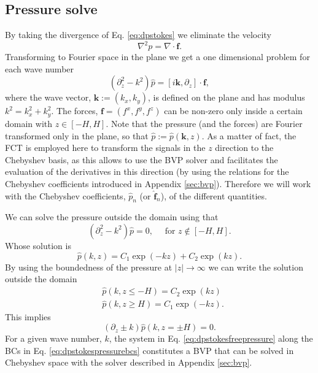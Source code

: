 \documentclass[ twoside,openright,titlepage,numbers=noenddot,%
headinclude,footinclude,cleardoublepage=empty,abstract=on,
BCOR=5mm,paper=b5,fontsize=11pt, dvipsnames
]{scrreprt}
\renewcommand{\vec}[1]{\bm{#1}}
\newcommand{\fou}[1]{\widehat{#1}}
\begin{document}
\subsection*{Pressure solve}
By taking the divergence of Eq. \eqref{eq:dpstokes} we eliminate the velocity
\begin{equation}
  \label{eq:dpstokespressure}
  \nabla^2 p = \nabla\cdot\vec{f}.
\end{equation}
Transforming to Fourier space in the plane we get a one dimensional problem for each wave number
\begin{equation}
  \label{eq:dpstokesfreepressure}
  (\partial^2_{z}-k^2)\fou{p} =
  \left[
    i\vec{k},
    \partial_z\right]
  \cdot\vec{f},
\end{equation}
where the wave vector, $\vec{k}:=(k_x, k_y)$, is defined on the plane and has modulus $k^2 = k_x^2 + k_y^2$. The forces, $\vec{f}=(f^x, f^y, f^z)$ can be non-zero only inside a certain domain with $z\in [-H,H]$. Note that the pressure (and the forces) are Fourier transformed only in the plane, so that $\fou{p} :=\fou{p}(\vec{k}, z)$. As a matter of fact, the \gls{FCT} is employed here to transform the signals in the $z$ direction to the Chebyshev basis, as this allows to use the \gls{BVP} solver and facilitates the evaluation of the derivatives in this direction (by using the relations for the Chebyshev coefficients introduced in Appendix \ref{sec:bvp}). Therefore we will work with the Chebyshev coefficients, $\fou{p}_n$ (or $\fou{\vec{f}}_n$), of the different quantities.

We can solve the pressure outside the domain using that
\begin{equation}
    (\partial^2_{z}-k^2)\fou{p} = 0, \quad \text{ for } z \notin [-H,H].
\end{equation}
Whose solution is
\begin{equation}
  \fou{p}(k, z) = C_1\exp(-kz) + C_2\exp(kz).
\end{equation}
By using the boundedness of the pressure at $|z|\rightarrow\infty$ we can write the solution outside the domain
\begin{equation}
  \begin{aligned}
    &\fou{p}(k,z\le -H) = C_2\exp(kz)\\
    &\fou{p}(k,z\ge H) = C_1\exp(-kz).
  \end{aligned}
\end{equation}
This implies
\begin{equation}
  \label{eq:dpstokespressurebcs}
  (\partial_z\pm k)\fou{p}(k, z=\pm H) = 0.
\end{equation}
For a given wave number, $k$, the system in Eq. \eqref{eq:dpstokesfreepressure} along the \glspl{BC} in Eq. \eqref{eq:dpstokespressurebcs} constitutes a \gls{BVP} that can be solved in Chebyshev space with the solver described in Appendix \ref{sec:bvp}.
\end{document}

